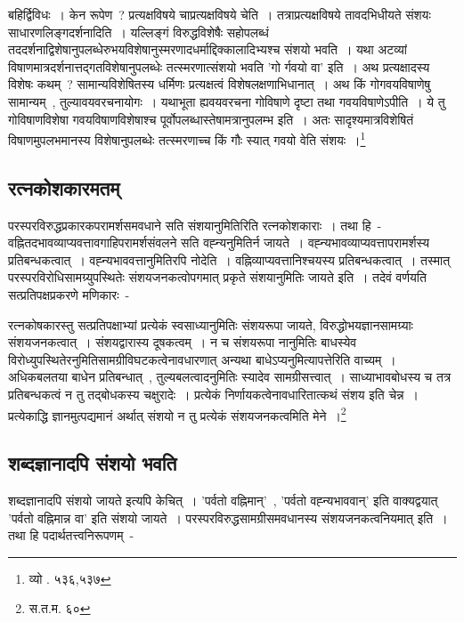 		{\fontsize{11.7}{0}\selectfont\s बहिर्द्विविधः~। केन रूपेण~?‌ प्रत्यक्षविषये चाप्रत्यक्षविषये चेति~। तत्राप्रत्यक्षविषये तावदभिधीयते संशयः साधारणलिङ्गदर्शनादिति~। यल्लिङ्गं विरुद्धविशेषैः‌ सहोपलब्धं तददर्शनाद्विशेषानुपलब्धेरुभयविशेषानुस्मरणादधर्माद्दिक्कालादिभ्यश्च संशयो भवति~। यथा अटव्यां‌ विषाणमात्रदर्शनात्तद्गतविशेषानुपलब्धेः तत्स्मरणात्संशयो भवति 'गो र्गवयो वा' इति~। अथ प्रत्यक्षादस्य विशेषः कथम्~? सामान्यविशेषितस्य धर्मिणः प्रत्यक्षत्वं विशेषलक्षणाभिधानात्~। अथ किं गोगवयविषाणेषु सामान्यम्~, तुल्यावयवरचनायोगः~। यथाभूता ह्यवयवरचना गोविषाणे दृष्टा तथा गवयविषाणेऽपीति~। ये तु गोविषाणविशेषा गवयविषाणविशेषाश्च पूर्वोपलब्धास्तेषामत्रानुपलम्भ इति~। अतः सादृश्यमात्रविशेषितं विषाणमुपलभमानस्य विशेषानुपलब्धेः तत्स्मरणाच्च किं गौः स्यात् गवयो वेति संशयः~।\footnote{व्यो . ५३६,५३७}}

		\subsection{रत्नकोशकारमतम्}

		परस्परविरुद्धप्रकारकपरामर्शसमवधाने सति संशयानुमितिरिति रत्नकोशकाराः~। तथा हि~- वह्नितदभावव्याप्यवत्तावगाहिपरामर्शसंवलने सति वह्न्यनुमितिर्न जायते~। वह्न्यभावव्याप्यवत्तापरामर्शस्य प्रतिबन्धकत्वात्~। वह्न्यभाववत्तानुमितिरपि नोदेति~। वह्निव्याप्यवत्तानिश्चयस्य प्रतिबन्धकत्वात्~। तस्मात् परस्परविरोधिसामग्र्युपस्थितेः संशयजनकत्वोपगमात् प्रकृते संशयानुमितिः जायते इति~। तदेवं वर्णयति सत्प्रतिपक्षप्रकरणे मणिकारः~-

		{\fontsize{11.7}{0}\selectfont\s रत्नकोषकारस्तु सत्प्रतिपक्षाभ्यां प्रत्येकं स्वसाध्यानुमितिः संशयरूपा जायते, विरुद्धोभयज्ञानसामग्र्याः संशयजनकत्वात्~। संशयद्वारास्य दूषकत्वम्~। न च संशयरूपा नानुमितिः बाधस्येव विरोध्युपस्थितेरनुमितिसामग्रीविघटकत्वेनावधारणात् अन्यथा बाधेऽप्यनुमित्यापत्तेरिति वाच्यम्~। अधिकबलतया बाधेन प्रतिबन्धात्~, तुल्यबलत्वादनुमितिः स्यादेव सामग्रीसत्त्वात्~। साध्याभावबोधस्य च तत्र प्रतिबन्धकत्वं न तु तद्बोधकस्य चक्षुरादेः~। प्रत्येकं निर्णायकत्वेनावधारितात्कथं संशय इति चेन्न~। प्रत्येकाद्धि ज्ञानमुत्पद्यमानं अर्थात् संशयो न तु प्रत्येकं संशयजनकत्वमिति मेने~।\footnote{स.त.म. ६०}}

		\subsection{शब्दज्ञानादपि संशयो भवति}

		शब्दज्ञानादपि संशयो जायते इत्यपि केचित्~। 'पर्वतो वह्निमान्'~, 'पर्वतो वह्न्यभाववान्' इति वाक्यद्वयात् 'पर्वतो वह्निमान्न वा' इति संशयो जायते~। परस्परविरुद्धसामग्रीसमवधानस्य संशयजनकत्वनियमात् इति~। तथा हि पदार्थतत्त्वनिरूपणम्~-

